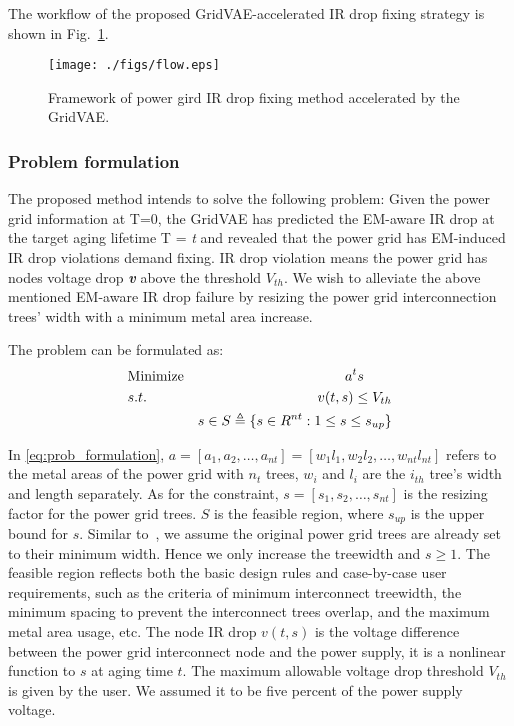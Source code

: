 The workflow of the proposed GridVAE-accelerated IR drop fixing strategy is shown in Fig.~\ref{fig:flow}. 


\begin{figure}[h!]
	\centering
	\texttt{[image: ./figs/flow.eps]}
	\caption{Framework of power gird IR drop fixing method accelerated by the GridVAE.}
	\label{fig:flow}
\end{figure}

\subsubsection{Problem formulation}
\label{subsubsec:formulation}
The proposed method intends to solve the following problem: 
Given the power grid information at T=0, the GridVAE has predicted the EM-aware IR drop at the target aging lifetime T = \textit{t} and revealed that the power grid has EM-induced IR drop violations demand fixing. IR drop violation means the power grid  has nodes voltage drop \textit{\textbf{v}} above the threshold $V_{th}$.
We wish to alleviate the above mentioned EM-aware IR drop failure by resizing the power grid interconnection trees' width with a minimum metal area increase.

The problem can be formulated as:
\begin{align}
	\label{eq:prob_formulation}
	&\mbox{Minimize}  & a^{t}s \qquad   \notag  \\
	&s.t.     & v(t,s)\leq V_{th} \\
	& \quad   &s \in S   \triangleq \{ s \in R^{nt}: 1 \leq s \leq s_{up} \}        \notag
\end{align}

In \eqref{eq:prob_formulation}, $a=[a_{1},a_{2},\ldots,a_{nt}] = [w_{1}l_{1},w_{2}l_{2},\ldots,w_{nt}l_{nt}]$ refers to the metal areas of the power grid with $n_{t}$ trees, $w_{i}$ and $l_{i}$ are the $i_{th}$ tree's width and length separately.
As for the constraint, $s=[s_{1},s_{2},\ldots,s_{nt}]$  is the resizing factor for the power grid trees. $S$ is the feasible region, where $s_{up}$ is the upper bound for $s$. Similar to~\cite{Sukharev:2019pg}, we assume the original power grid trees are already set to their minimum width. Hence we only increase the treewidth and $s \geq 1 $.
The feasible region reflects both the basic design rules and case-by-case user requirements, such as the criteria of minimum interconnect treewidth, the minimum spacing to prevent the interconnect trees overlap, and the maximum metal area usage, etc. 
The node IR drop $v(t,s)$ is the voltage difference between the power grid interconnect node and the power supply, it is a nonlinear function to $s$ at aging time $t$. The maximum allowable voltage drop threshold $V_{th}$ is given by the user. We assumed it to be five percent of the power supply voltage.


